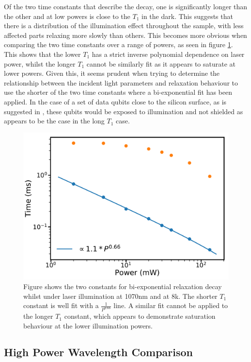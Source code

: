 Of the two time constants that describe the decay, one is significantly longer than the other and at low powers is close to the $T_1$ in the dark.
This suggests that there is a distribution of the illumination effect throughout the sample, with less affected parts relaxing more slowly than others. 
This becomes more obvious when comparing the two time constants over a range of powers, as seen in figure \ref{fig:T1avsT1b}.
This shows that the lower $T_1$ has a strict inverse polynomial dependence on laser power, whilst the longer $T_1$ cannot be similarly fit as it appears to saturate at lower powers.
Given this, it seems prudent when trying to determine the relationship between the incident light parameters and relaxation behaviour to use the shorter of the two time constants where a bi-exponential fit has been applied.
In the case of a set of data qubits close to the silicon surface, as is suggested in \cite{OGorman2014}, these qubits would be exposed to illumination and not shielded as appears to be the case in the long $T_1$ case.



\begin{figure}
\centering
\includegraphics[width = 0.8\columnwidth]{Figures/hpT1avsT1b.pdf} 
\caption[Bi-exponential relaxation decay constants]{Figure shows the two constants for bi-exponential relaxation decay whilst under laser illumination at 1070nm and at 8k. The shorter $T_1$ constant is well fit with a $\frac{1}{P^{0.66}}$ line. A similar fit cannot be applied to the longer $T_1$ constant, which appears to demonstrate saturation behaviour at the lower illumination powers.}
\label{fig:T1avsT1b}
\end{figure}

\subsection{High Power Wavelength Comparison}

